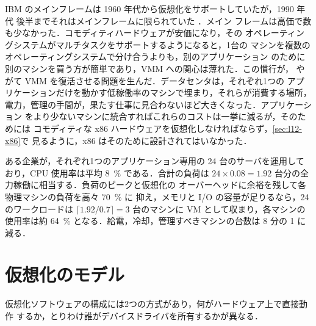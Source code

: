 \documentclass[../main.tex]{subfiles}
\begin{document}
IBM のメインフレームは 1960 年代から仮想化をサポートしていたが，1990 年代
後半までそれはメインフレームに限られていた
\cite{rosenblum2005}．メイン
フレームは高価で数も少なかった．コモディティハードウェアが安価になり，その
オペレーティングシステムがマルチタスクをサポートするようになると，1台の
マシンを複数のオペレーティングシステムで分け合うよりも，別のアプリケーション
のために別のマシンを買う方が簡単であり，VMM への関心は薄れた．この慣行が，
やがて VMM を復活させる問題を生んだ．データセンタは，それぞれ1つの
アプリケーションだけを動かす低稼働率のマシンで埋まり，それらが消費する場所，
電力，管理の手間が，果たす仕事に見合わないほど大きくなった．アプリケーション
をより少ないマシンに統合すればこれらのコストは一挙に減るが，そのためには
コモディティな x86 ハードウェアを仮想化しなければならず，\cref{sec:l12-x86}で
見るように，x86 はそのために設計されてはいなかった．

\begin{example}
  ある企業が，それぞれ1つのアプリケーション専用の 24 台のサーバを運用して
  おり，CPU 使用率は平均 \SI{8}{\percent} である．合計の負荷は
  $24 \times 0.08 = 1.92$ 台分の全力稼働に相当する．負荷のピークと仮想化の
  オーバーヘッドに余裕を残して各物理マシンの負荷を高々 \SI{70}{\percent} に
  抑え，メモリと I/O の容量が足りるなら，24 のワークロードは
  $\lceil 1.92/0.7 \rceil = 3$ 台のマシンに VM として収まり，各マシンの
  使用率は約 \SI{64}{\percent} となる．給電，冷却，管理すべきマシンの台数は
  8 分の 1 に減る．
\end{example}

\section{仮想化のモデル}
\label{sec:l12-models}

仮想化ソフトウェアの構成には2つの方式があり，何がハードウェア上で直接動作
するか，とりわけ誰がデバイスドライバを所有するかが異なる．
\end{document}
